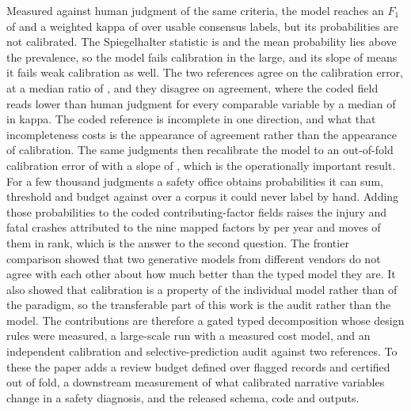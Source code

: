 Measured against human judgment of the same criteria, the model reaches an $F_1$ of
\GoldFone{} and a weighted kappa of \GoldKappa{} over \GoldNUsable{} usable consensus labels,
but its probabilities are not calibrated. The Spiegelhalter statistic is \GoldZ{} and the mean
probability lies above the prevalence, so the model fails calibration in the large, and its
slope of \GoldSlope{} means it fails weak calibration as well. The two references agree on the
calibration error, at a median ratio of \ECEGapMedian{}, and they disagree on agreement, where
the coded field reads lower than human judgment for every comparable variable by a median of
\KappaGapMedian{} in kappa. The coded reference is incomplete in one direction, and what that
incompleteness costs is the appearance of agreement rather than the appearance of calibration.
The same \GoldNUsable{} judgments then recalibrate the model to an out-of-fold calibration
error of \RecalIsoECE{} with a slope of \RecalPlattSlope{}, which is the operationally
important result. For a few thousand judgments a safety office obtains probabilities it can
sum, threshold and budget against over a corpus it could never label by hand. Adding those
probabilities to the coded contributing-factor fields raises the injury and fatal crashes
attributed to the nine mapped factors by \DownAddedTotal{} per year and moves
\DownNRankMove{} of them in rank, which is the answer to the second question. The frontier
comparison showed that two generative models from different vendors do not agree with each
other about how much better than the typed model they are. It also showed that calibration is a
property of the individual model rather than of the paradigm, so the transferable part of this
work is the audit rather than the model. The contributions are therefore a gated typed
decomposition whose design rules were measured, a large-scale run with a measured cost model,
and an independent calibration and selective-prediction audit against two references. To these
the paper adds a review budget defined over flagged records and certified out of fold, a
downstream measurement of what calibrated narrative variables change in a safety diagnosis, and
the released schema, code and outputs.

